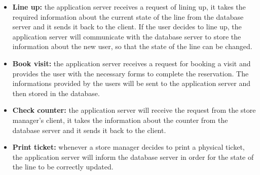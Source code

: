 \documentclass{article}
\begin{document}
\begin{itemize}
\item\textbf{Line up:} the application server receives a request of lining up, it takes the required information about the current state of the line from the database server and it sends it back to the client. If the user decides to line up, the application server will communicate with the database server to store the information about the new user, so that the state of the line can be changed. 
\item\textbf{Book visit:} the application server receives a request for booking a visit and provides the user with the necessary forms to complete the reservation. The informations provided by the users will be sent to the application server and then stored in the database.
\item\textbf{Check counter:} the application server will receive the request from the store manager’s client, it takes the information about the counter from the database server and it sends it back to the client.
\item\textbf{Print ticket:} whenever a store manager decides to print a physical ticket, the application server will inform the database server in order for the state of the line to be correctly updated.
\end{itemize}
\end{document}
